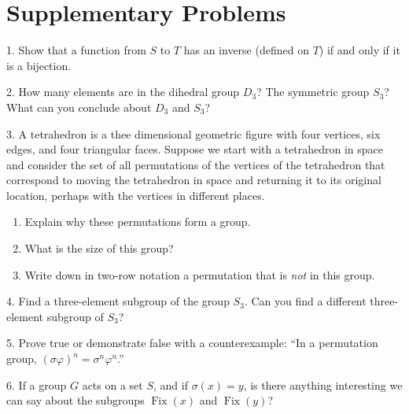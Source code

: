 \documentclass[10pt,]{book}
\theoremstyle{plain}
\theoremstyle{definition}
\theoremstyle{definition}
\numberwithin{equation}{chapter}
\DeclareMathOperator{\Fix}{Fix}
\begin{document}
\section[{Supplementary Problems}]{Supplementary Problems}\label{sec_groups-suppprobs}
\begin{exerciselist}
\item[1.]\marginsymbol[-1em]{} \hypertarget{exercise-54}{}Show that a function from \(S\) to \(T\) has an inverse (defined on \(T\)) if and only if it is a bijection.%
\par\smallskip
\item[2.]\marginsymbol[-1em]{} \hypertarget{exercise-55}{}How many elements are in the dihedral group \(D_3\)?  The symmetric group \(S_3\)?  What can you conclude about \(D_3\) and \(S_3\)?%
\par\smallskip
\item[3.]\marginsymbol[-1em]{} \hypertarget{exercise-56}{}A tetrahedron is a thee dimensional geometric figure with four vertices, six edges, and four triangular faces.  Suppose we start with a tetrahedron in space and consider the set of all permutations of the vertices of the tetrahedron that correspond to moving the tetrahedron in space and returning it to its original location, perhaps with the vertices in different places. \leavevmode%
\begin{enumerate}[label=(\alph*)]
\item\hypertarget{li-114}{}Explain why these permutations form a group.%
\item\hypertarget{li-115}{}What is the size of this group?%
\item\hypertarget{li-116}{}Write down in two-row notation a permutation that is \emph{not} in this group.%
\end{enumerate}
%
\par\smallskip
\item[4.]\marginsymbol[-1em]{} \hypertarget{exercise-57}{}Find a three-element subgroup of the group \(S_3\).  Can you find a different three-element subgroup of \(S_3\)?%
\par\smallskip
\item[5.]\marginsymbol[-1em]{} \hypertarget{exercise-58}{}Prove true or demonstrate false with a counterexample: ``In a permutation group, \((\sigma\varphi)^n = \sigma^n\varphi^n\).''%
\par\smallskip
\item[6.]\marginsymbol[-1em]{} \hypertarget{exercise-59}{}If a group \(G\) acts on a set \(S\), and if \(\sigma(x) =y\), is there anything interesting we can say about the subgroups \(\Fix(x)\) and \(\Fix(y)\)?%

\end{exerciselist}
\end{document}
